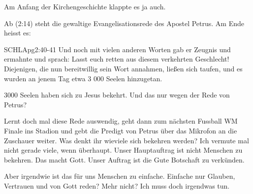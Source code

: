 \documentclass[14pt]{../../inc/mybib}
\newenvironment{block}[1][]{%
  \vspace{1.5em}%
  \noindent\textbf{#1}\par%
  \vspace{0.0em}%
}{%
  \vspace{1em}%
}
\begin{document}
    Am Anfang der Kirchengeschichte klappte es ja auch.
\begin{block}
    Ab (2:14) steht die gewaltige Evangelisationsrede des Apostel Petrus. Am Ende heisst es:
    \begin{bibelbox}{SCHL}{Apg}{2:40-41}
        Und noch mit vielen anderen Worten gab er Zeugnis und ermahnte und sprach: Lasst euch retten aus diesem verkehrten Geschlecht! Diejenigen, die nun bereitwillig sein Wort annahmen, ließen sich taufen, und es wurden an jenem Tag etwa 3 000 Seelen hinzugetan.
    \end{bibelbox} 
    3000 Seelen haben sich zu Jesus bekehrt. Und das nur wegen der Rede von Petrus?
    
    Lernt doch mal diese Rede auswendig, geht dann zum nächsten Fussball WM Finale ins Stadion und gebt die Predigt von Petrus über das Mikrofon an die Zuschauer weiter. Was denkt ihr wieviele sich bekehren werden? Ich vermute mal nicht gerade viele, wenn überhaupt. Unser Hauptauftrag ist nicht Menschen zu bekehren. Das macht Gott. Unser Auftrag ist die Gute Botschaft zu verkünden.
\end{block}
\begin{block}
    Aber irgendwie ist das für uns Menschen zu einfache. Einfache nur Glauben, Vertrauen und von Gott reden? Mehr nicht? Ich muss doch irgendwas tun.
\end{block}
\end{document}
